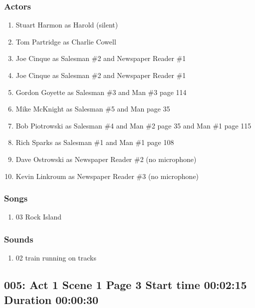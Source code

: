 \subsubsection{Actors}
\begin{enumerate}
\item Stuart Harmon as Harold (silent)
\item Tom Partridge as Charlie Cowell
\item Joe Cinque as Salesman \#2 and Newspaper Reader \#1
\item Joe Cinque as Salesman \#2 and Newspaper Reader \#1
\item Gordon Goyette as Salesman \#3 and Man \#3 page 114
\item Mike McKnight as Salesman \#5 and Man page 35
\item Bob Piotrowski as Salesman \#4 and Man \#2 page 35 and Man \#1 page 115
\item Rich Sparks as Salesman \#1 and Man \#1 page 108
\item Dave Ostrowski as Newspaper Reader \#2 (no microphone)
\item Kevin Linkroum as Newspaper Reader \#3 (no microphone)
\end{enumerate}

\subsubsection{Songs}
\begin{enumerate}
\item 03 Rock Island
\end{enumerate}\subsubsection{Sounds}
\begin{enumerate}
\item 02 train running on tracks
\end{enumerate}
\subsection{005: Act 1 Scene 1 Page 3 Start time 00:02:15 Duration 00:00:30}

